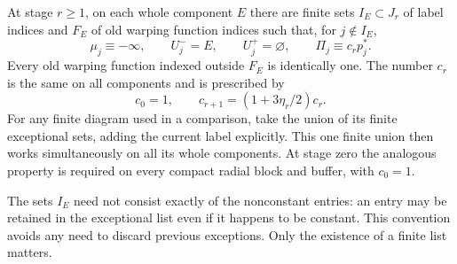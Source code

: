 \begin{definition}\label{countable:finite-data}
At stage $r\ge1$, on each whole component $E$ there are finite sets
$I_E\subset J_r$ of label indices and $F_E$ of old warping function indices such
that, for $j\notin I_E$,
\begin{equation}\label{countable:constant-data}
 \mu_j\equiv-\infty,\qquad U_j^-=E,\qquad U_j^+=\varnothing,
 \qquad \Pi_j\equiv c_rp_j^*.
\end{equation}
Every old warping function indexed outside $F_E$ is identically one.
The number $c_r$ is the same on all components and is prescribed by
\begin{equation}\label{countable:constant-data-multiplier}
 c_0=1,\qquad c_{r+1}=(1+3\eta_r/2)c_r.
\end{equation}
For any finite diagram used in a comparison, take the union of its
finite exceptional sets, adding the current label explicitly. This
one finite union then works simultaneously on all its whole components.
At stage zero the analogous property is required on every compact
radial block and buffer, with $c_0=1$.
\end{definition}

The sets $I_E$ need not consist exactly of the nonconstant entries: an
entry may be retained in the exceptional list even if it happens to be
constant. This convention avoids any need to discard previous exceptions.
Only the existence of a finite list matters.

